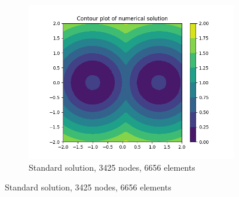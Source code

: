 \documentclass[11pt]{article}
\begin{document}
\begin{figure}
\begin{subfigure}[b]{0.45\textwidth}
    \includegraphics[scale=0.6]{solution-refined.png}
    \caption{Standard solution, 3425 nodes, 6656 elements}
  \end{subfigure}
\end{figure}
\end{document}
